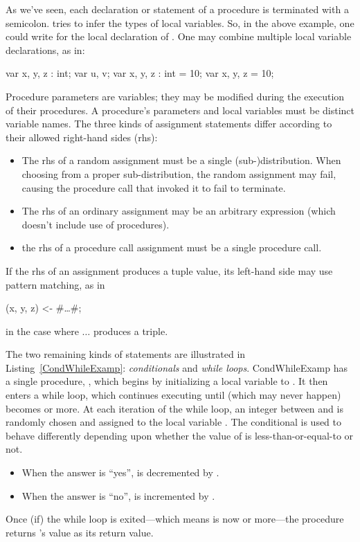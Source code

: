 As we've seen, each declaration or statement of a procedure is
terminated with a semicolon.  \EasyCrypt tries to infer the types of
local variables. So, in the above example, one could write
 for the local declaration of .
One may combine multiple local variable declarations, as in:
\begin{easycrypt}{}{}
var x, y, z : int;
var u, v;
var x, y, z : int = 10;
var x, y, z = 10;
\end{easycrypt}
Procedure parameters are variables; they may be modified during the
execution of their procedures.  A procedure's parameters and local
variables must be distinct variable names.  The three kinds of
assignment statements differ according to their allowed right-hand
sides (rhs):
\begin{itemize}
\item The rhs of a random assignment must be a single
  (sub-)distribution. When choosing from a proper sub-distribution,
  the random assignment may fail, causing the procedure call that
  invoked it to fail to terminate.

\item The rhs of an ordinary assignment may be an arbitrary expression
  (which doesn't include use of procedures).

\item the rhs of a procedure call assignment must be a single procedure
  call.  
\end{itemize}
If the rhs of an assignment produces a tuple value, its left-hand side
may use pattern matching, as in
\begin{easycrypt}{}{}
(x, y, z) <- #\ldots#;
\end{easycrypt}
in the case where $\ldots$ produces a triple.

The two remaining kinds of statements are illustrated in
Listing~\ref{CondWhileExamp}: \emph{conditionals} and \emph{while
  loops}.
 {}{CondWhileExamp}
 has a single procedure,
, which begins by initializing a local variable  to
. It then enters a while loop, which continues executing until
(which may never happen)  becomes  or more. At each
iteration of the while loop, an integer between  and  is
randomly chosen and assigned to the local variable . The
conditional is used to behave differently depending upon whether the
value of  is less-than-or-equal-to  or not.
\begin{itemize}
\item When the answer is ``yes'',  is decremented by .

\item When the answer is ``no'',  is incremented by .
\end{itemize}
Once (if) the while loop is exited---which means  is now 
or more---the procedure returns 's value as its return value.

